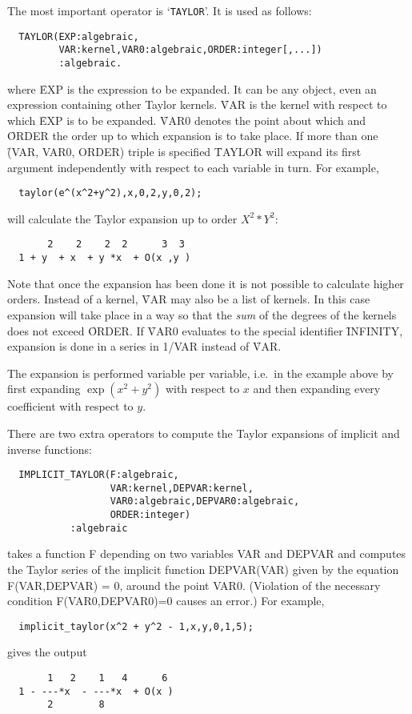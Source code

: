 


The most important operator is `\verb+TAYLOR+'. 
It is used as follows:
\hypertarget{operator:TAYLOR}{}
\begin{verbatim}
  TAYLOR(EXP:algebraic,
         VAR:kernel,VAR0:algebraic,ORDER:integer[,...])
         :algebraic.
\end{verbatim}
where \f{EXP} is the expression to be expanded. It can be any \REDUCE{}
object, even an expression containing other Taylor kernels. \f{VAR} is
the kernel with respect to which \f{EXP} is to be expanded. \f{VAR0}
denotes the point about which and \f{ORDER} the order up to which
expansion is to take place. If more than one \f{(VAR, VAR0, ORDER)} triple
is specified \f{TAYLOR} will expand its first argument independently
with respect to each variable in turn. For example,
\begin{verbatim}
  taylor(e^(x^2+y^2),x,0,2,y,0,2);
\end{verbatim}
will calculate the Taylor expansion up to order $X^{2}*Y^{2}$:
\begin{verbatim}
       2    2    2  2      3  3
  1 + y  + x  + y *x  + O(x ,y )
\end{verbatim}
Note that once the expansion has been done it is not possible to
calculate higher orders.
Instead of a kernel, \f{VAR} may also
be a list of kernels. In this case expansion will take place in a way
so that the \emph{sum} of the degrees of the kernels does not exceed
\f{ORDER}.
If \f{VAR0} evaluates to the special identifier \f{INFINITY}, expansion is
done in a series in 1/VAR instead of \f{VAR}.

The expansion is performed variable per variable, i.e.\ in the example
above by first expanding $\exp(x^{2}+y^{2})$ with respect to $x$ and
then expanding every coefficient with respect to $y$.

\hypertarget{operator:IMPLICIT_TAYLOR}{}
There are two
extra operators to compute the Taylor expansions of implicit and
inverse functions:
\begin{verbatim}
  IMPLICIT_TAYLOR(F:algebraic,
                  VAR:kernel,DEPVAR:kernel,
                  VAR0:algebraic,DEPVAR0:algebraic,
                  ORDER:integer)
           :algebraic
\end{verbatim}
takes a function F depending on two variables VAR and DEPVAR and
computes the Taylor series of the implicit function DEPVAR(VAR)
given by the equation F(VAR,DEPVAR) = 0, around the point VAR0.  
(Violation of the necessary condition F(VAR0,DEPVAR0)=0 causes an error.)
For example,
\begin{verbatim}
  implicit_taylor(x^2 + y^2 - 1,x,y,0,1,5);
\end{verbatim}
gives the output
\begin{verbatim}
       1   2    1   4      6
  1 - ---*x  - ---*x  + O(x )
       2        8
\end{verbatim}

